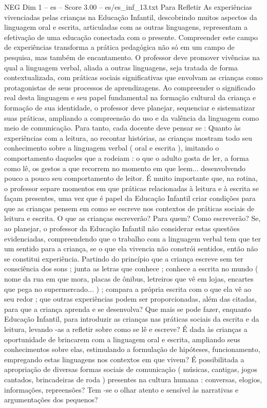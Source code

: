 \begin{textsample}{NEG Dim 1 – es – Score 3.00 – es/es\_inf\_13.txt}  \label{ex:f1_neg_095}
Para Refletir As experiências vivenciadas pelas crianças na Educação Infantil, descobrindo muitos aspectos da linguagem oral e escrita, articuladas com as outras linguagens, representam a efetivação de uma educação conectada com o presente.
Compreender este campo de experiências transforma a prática pedagógica não só em um campo de pesquisa, mas também de encantamento.
O professor deve promover vivências na qual a linguagem verbal, aliada a outras linguagens, seja tratada de forma contextualizada, com práticas sociais significativas que envolvam as crianças como protagonistas de seus processos de aprendizagens.
Ao compreender o significado real desta linguagem e seu papel fundamental na formação cultural da criança e formação de sua identidade, o professor deve planejar, sequenciar e sistematizar suas práticas, ampliando a compreensão do uso e da valência da linguagem como meio de comunicação.
Para tanto, cada docente deve pensar se : Quanto às experiências com a leitura, ao recontar histórias, as crianças mostram todo seu conhecimento sobre a linguagem verbal ( oral e escrita ), imitando o comportamento daqueles que a rodeiam : o que o adulto gosta de ler, a forma como lê, os gestos a que recorrem no momento em que leem... desenvolvendo pouco a pouco seu comportamento de leitor.
É muito importante que, na rotina, o professor separe momentos em que práticas relacionadas à leitura e à escrita se façam presentes, uma vez que é papel da Educação Infantil criar condições para que as crianças pensem em como se escreve nos contextos de práticas sociais de leitura e escrita.
O que as crianças escreverão?
Para quem?
Como escreverão?
Se, ao planejar, o professor da Educação Infantil não considerar estas questões evidenciadas, compreendendo que o trabalho com a linguagem verbal tem que ter um sentido para a criança, se o que ela vivencia não constrói sentidos, então não se constitui experiência.
Partindo do princípio que a criança escreve sem ter consciência dos sons ; junta as letras que conhece ; conhece a escrita no mundo ( nome da rua em que mora, placas de ônibus, letreiros que vê em lojas, encartes que pega no supermercado... ) ; compara a própria escrita com o que ela vê ao seu redor ; que outras experiências podem ser proporcionadas, além das citadas, para que a criança aprenda e se desenvolva?
Que mais se pode fazer, enquanto Educação Infantil, para introduzir as crianças nas práticas sociais da escrita e da leitura, levando -as a refletir sobre como se lê e escreve?
É dada às crianças a oportunidade de brincarem com a linguagem oral e escrita, ampliando seus conhecimentos sobre elas, estimulando a formulação de hipóteses, funcionamento, empregando estas linguagens nos contextos em que vivem?
É possibilitada a apropriação de diversas formas sociais de comunicação ( músicas, cantigas, jogos cantados, brincadeiras de roda ) presentes na cultura humana : conversas, elogios, informações, repreensões?
Tem -se o olhar atento e sensível às narrativas e argumentações dos pequenos?

\end{textsample}
